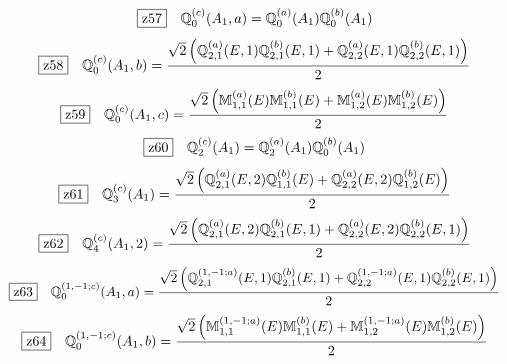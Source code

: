 \documentclass[fleqn,10pt,landscape]{jsarticle}
\begin{document}
\begin{dmath*}
\hspace*{3mm}\fbox{z57}\quad \mathbb{Q}_{0}^{(c)}(A_{1},a)=\mathbb{Q}_{0}^{(a)}(A_{1}) \mathbb{Q}_{0}^{(b)}(A_{1})
\end{dmath*}
\begin{dmath*}
\hspace*{3mm}\fbox{z58}\quad \mathbb{Q}_{0}^{(c)}(A_{1},b)=\frac{\sqrt{2} \left(\mathbb{Q}_{2,1}^{(a)}(E,1) \mathbb{Q}_{2,1}^{(b)}(E,1) + \mathbb{Q}_{2,2}^{(a)}(E,1) \mathbb{Q}_{2,2}^{(b)}(E,1)\right)}{2}
\end{dmath*}
\begin{dmath*}
\hspace*{3mm}\fbox{z59}\quad \mathbb{Q}_{0}^{(c)}(A_{1},c)=\frac{\sqrt{2} \left(\mathbb{M}_{1,1}^{(a)}(E) \mathbb{M}_{1,1}^{(b)}(E) + \mathbb{M}_{1,2}^{(a)}(E) \mathbb{M}_{1,2}^{(b)}(E)\right)}{2}
\end{dmath*}
\begin{dmath*}
\hspace*{3mm}\fbox{z60}\quad \mathbb{Q}_{2}^{(c)}(A_{1})=\mathbb{Q}_{2}^{(a)}(A_{1}) \mathbb{Q}_{0}^{(b)}(A_{1})
\end{dmath*}
\begin{dmath*}
\hspace*{3mm}\fbox{z61}\quad \mathbb{Q}_{3}^{(c)}(A_{1})=\frac{\sqrt{2} \left(\mathbb{Q}_{2,1}^{(a)}(E,2) \mathbb{Q}_{1,1}^{(b)}(E) + \mathbb{Q}_{2,2}^{(a)}(E,2) \mathbb{Q}_{1,2}^{(b)}(E)\right)}{2}
\end{dmath*}
\begin{dmath*}
\hspace*{3mm}\fbox{z62}\quad \mathbb{Q}_{4}^{(c)}(A_{1},2)=\frac{\sqrt{2} \left(\mathbb{Q}_{2,1}^{(a)}(E,2) \mathbb{Q}_{2,1}^{(b)}(E,1) + \mathbb{Q}_{2,2}^{(a)}(E,2) \mathbb{Q}_{2,2}^{(b)}(E,1)\right)}{2}
\end{dmath*}
\begin{dmath*}
\hspace*{3mm}\fbox{z63}\quad \mathbb{Q}_{0}^{(1,-1;c)}(A_{1},a)=\frac{\sqrt{2} \left(\mathbb{Q}_{2,1}^{(1,-1;a)}(E,1) \mathbb{Q}_{2,1}^{(b)}(E,1) + \mathbb{Q}_{2,2}^{(1,-1;a)}(E,1) \mathbb{Q}_{2,2}^{(b)}(E,1)\right)}{2}
\end{dmath*}
\begin{dmath*}
\hspace*{3mm}\fbox{z64}\quad \mathbb{Q}_{0}^{(1,-1;c)}(A_{1},b)=\frac{\sqrt{2} \left(\mathbb{M}_{1,1}^{(1,-1;a)}(E) \mathbb{M}_{1,1}^{(b)}(E) + \mathbb{M}_{1,2}^{(1,-1;a)}(E) \mathbb{M}_{1,2}^{(b)}(E)\right)}{2}
\end{dmath*}
\end{document}
